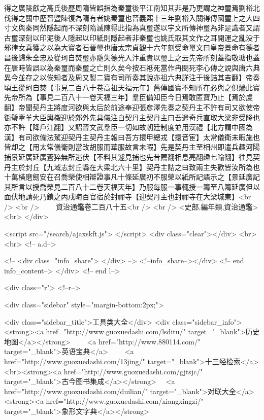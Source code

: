 得之廣陵獻之高氏後歷周隋皆誤指為秦璽後平江南知其非是乃更謂之神璽焉劉裕北伐得之關中歷晉暨陳復為隋有者姚秦璽也晉義熙十三年劉裕入關得傳國璽上之大四寸文與秦同然隱起而不深刻隋滅陳得此指為真璽遂以宇文所傳神璽為非是識者又謂古璽深刻以印泥後人隱起以印紙則隱起者非秦璽也姚氏取其文作之耳開運之亂没于邪律女真獲之以為大寶者石晉璽也唐太宗貞觀十六年刻受命璽文曰皇帝景命有德者昌後歸朱全忠及從珂自焚璽亦隨失德光入汴重貴以璽上之云先帝所刻蓋指敬瑭也蓋在唐時皆誤以為秦璽而秦璽之亡則久矣今按石袛死當作冉閔死李心傳之說與唐六典異今並存之以俟知者及周又製二寶有司所奏其說亦祖六典詳注于後詰其吉翻】帝奏頃王從珂自焚【事見二百八十卷高祖天福元年】舊傳國寶不知所在必與之俱燼此寶先帝所為【事見二百八十一卷天福三年】羣臣備知臣今日焉敢匿寶乃止【焉於䖍翻】帝聞契丹主將度河欲與太后於前途奉迎張彦澤先奏之契丹主不許有司又欲使帝衘璧牽羊大臣輿櫬迎於郊外先具儀注白契丹主契丹主曰吾遣奇兵直取大梁非受降也亦不許【降戶江翻】又詔晉文武羣臣一切如故朝廷制度並用漢禮【北方謂中國為漢】有司欲備法駕迎契丹主契丹主報曰吾方擐甲總戎【擐音宦】太常儀衛未暇施也皆却之【用太常儀衛則當改胡服而華服故言未暇】先是契丹主至相州即遣兵趣河陽捕景延廣延廣蒼猝無所逃伏【不料其遽見捕也先昔薦翻相息亮翻趣七喻翻】往見契丹主於封丘【九域志封丘縣在大梁北六十里】契丹主詰之曰致兩主失歡皆汝所為也十萬橫磨劒安在召喬榮使相辯證事凡十條延廣初不服榮以紙所記語示之【景延廣記其所言以授喬榮見二百八十二卷天福天年】乃服每服一事輒授一籌至八籌延廣但以面伏地請死乃鎖之丙戌晦百官宿於封禪寺【迎契丹主也封禪寺在大梁城東】<br />
<br />
　　資治通鑑卷二百八十五<br />
<br />
<史部,編年類,資治通鑑>  <br>
   </div> 

<script src="/search/ajaxskft.js"> </script>
 <div class="clear"></div>
<br>
<br>
 <!-- a.d-->

 <!--
<div class="info_share">
</div> 
-->
 <!--info_share--></div>   <!-- end info_content-->
  </div> <!-- end l-->

<div class="r">   <!--r-->



<div class="sidebar"  style="margin-bottom:2px;">

 
<div class="sidebar_title">工具类大全</div>
<div class="sidebar_info">
<strong><a href="http://www.guoxuedashi.com/lsditu/" target="_blank">历史地图</a></strong>　　
<a href="http://www.880114.com/" target="_blank">英语宝典</a>　　
<a href="http://www.guoxuedashi.com/13jing/" target="_blank">十三经检索</a>　
<br><strong><a href="http://www.guoxuedashi.com/gjtsjc/" target="_blank">古今图书集成</a></strong>　
<a href="http://www.guoxuedashi.com/duilian/" target="_blank">对联大全</a>　<strong><a href="http://www.guoxuedashi.com/xiangxingzi/" target="_blank">象形文字典</a></strong>　

